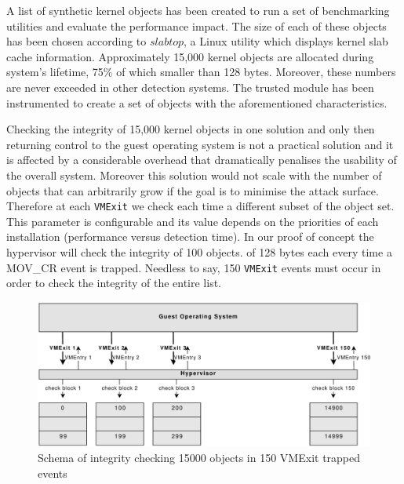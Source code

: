 %
%
A list of synthetic kernel objects has been created to run a set of benchmarking utilities and evaluate the performance impact. The size of each of these objects has been chosen according to $slabtop$, a Linux utility which displays kernel slab cache information. Approximately 15,000 kernel objects are allocated during system's lifetime, 75\% of which smaller than 128 bytes. Moreover, these numbers are never exceeded in other detection systems.
The trusted module has been instrumented to create a set of objects with the aforementioned characteristics. 

Checking the integrity of 15,000 kernel objects in one solution and only then returning control to the guest operating system is not a practical solution and it is affected by a considerable overhead that dramatically penalises the usability of the overall system. Moreover this solution would not scale with the number of objects that can arbitrarily grow if the goal is to minimise the attack surface. Therefore at each \texttt{VMExit} we check each time a different subset of the object set. This parameter is configurable and its value depends on the priorities of each installation (performance versus detection time). 
In our proof of concept the hypervisor will check the integrity of 100 objects. of 128 bytes each every time a MOV\_CR event is trapped. Needless to say, 150 \texttt{VMExit} events must occur in order to check the integrity of the entire list.

\begin{figure}[htbp] 
\begin{center}
\includegraphics[scale=0.45]{images/hr_relax.pdf}
\caption{{Schema of integrity checking 15000 objects in 150 VMExit trapped events}}
\label{schema_hr_relax}
\end{center}
\end{figure}

